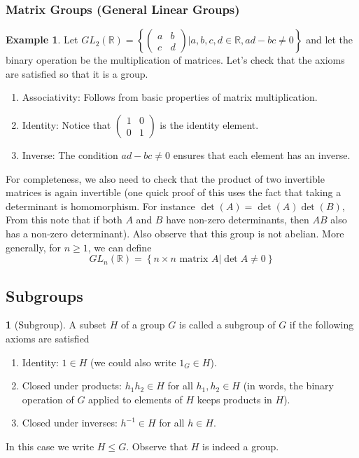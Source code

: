 \documentclass[12pt]{article}
\theoremstyle{definition}
\newtheorem{definition}{\color{NavyBlue}{\textbf{Definition}}}
\newtheorem{example}{\color{WildStrawberry}Example}
\theoremstyle{definition}
\begin{document}
\subsubsection{Matrix Groups (General Linear Groups)}
\begin{example}
Let $GL_2(\mathbb{R}) = \left\{ \begin{pmatrix} a & b \\ c & d \end{pmatrix} \Big\vert a,b,c,d \in \mathbb{R}, ad-bc \neq 0 \right\}$ and let the binary operation be the multiplication of matrices. Let's check that the axioms are satisfied so that it is a group.
\begin{enumerate}
\item Associativity: Follows from basic properties of matrix multiplication. 
\item Identity: Notice that $\begin{pmatrix} 1 & 0 \\ 0 & 1 \end{pmatrix}$ is the identity element.
\item Inverse: The condition $ad-bc \neq 0$ ensures that each element has an inverse.
\end{enumerate}
For completeness, we also need to check that the product of two invertible matrices is again invertible (one quick proof of this uses the fact that taking a determinant is homomorphism. For instance $\det(A) = \det(A)\det(B)$, From this note that if both $A$ and $B$ have non-zero determinants, then $AB$ also has a non-zero determinant). Also observe that this group is not abelian. More generally, for $n\geq 1$, we can define
\begin{equation}
GL_n(\mathbb{R}) = \left\{ n\times n \text{ matrix } A \Big\vert \det{A} \neq 0 \right\}
\end{equation}
\end{example}

\subsection{Subgroups}
\begin{definition}[Subgroup]
A subset $H$ of a group $G$ is called a subgroup of $G$ if the following axioms are satisfied
\begin{enumerate}
\item Identity: $1 \in H$ (we could also write $1_G \in H$).
\item Closed under products: $h_1 h_2 \in H$ for all $h_1, h_2 \in H$ (in words, the binary operation of $G$ applied to elements of $H$ keeps products in $H$). 
\item Closed under inverses: $h^{-1} \in H$ for all $h\in H$. 
\end{enumerate}
In this case we write $H \leq G$. Observe that $H$ is indeed a group.
\end{definition}
\end{document}

